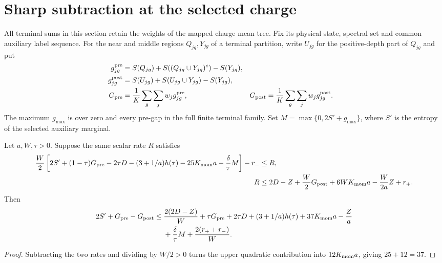 \section{Sharp subtraction at the selected charge}
\label{sec:arealaw-selected-sharp-comparison}

All terminal sums in this section retain the weights of the mapped
charge mean tree. Fix its physical state, spectral set and common
auxiliary label sequence. For the near and middle regions $Q_{jg},Y_{jg}$
of a terminal partition, write $U_{jg}$ for the positive-depth part of
$Q_{jg}$ and put
\begin{align}
    g^{\rm pre}_{jg}
                 & =S(Q_{jg})+S((Q_{jg}\cup Y_{jg})^c)-S(Y_{jg}),\nonumber   \\
    g^{\rm post}_{jg}
                 & =S(U_{jg})+S(U_{jg}\cup Y_{jg})-S(Y_{jg}),\nonumber       \\
    G_{\rm pre}  & =\frac1K\sum_g\sum_jw_jg^{\rm pre}_{jg},                &
    G_{\rm post} & =\frac1K\sum_g\sum_jw_jg^{\rm post}_{jg}.
    \label{eq:arealaw-selected-terminal-averages}
\end{align}
The maximum $g_{\max}$ is over zero and every pre-gap in the full finite
terminal family. Set $M=\max\{0,2S'+g_{\max}\}$, where $S'$ is the
entropy of the selected auxiliary marginal.

\begin{lemma}
    \label{thm:arealaw-sharp-comparison-subtraction}
    \leanok
    Let $a,W,\tau>0$. Suppose the same scalar rate $R$ satisfies
    \begin{align}
        \frac W2\left[2S'+(1-\tau)G_{\rm pre}-2\tau D
            -(3+1/a)h(\tau)-25K_{\rm mom}a-\frac\delta\tau M\right]-r_-
          & \le R,\nonumber              \\
        R & \le2D-Z+\frac W2G_{\rm post}
        +6WK_{\rm mom}a-\frac W{2a}Z+r_+.
        \label{eq:arealaw-sharp-scalar-premises}
    \end{align}
    Then
    \begin{align}
        2S'+G_{\rm pre}-G_{\rm post}
        \le{} & \frac{2(2D-Z)}W+\tau G_{\rm pre}+2\tau D
        +(3+1/a)h(\tau)+37K_{\rm mom}a-\frac Za\nonumber \\
              & +\frac\delta\tau M+\frac{2(r_++r_-)}W.
        \label{eq:arealaw-sharp-scalar-subtraction}
    \end{align}
\end{lemma}
\begin{proof}
    \leanok
    Subtracting the two rates and dividing by $W/2>0$ turns the upper quadratic
    contribution into $12K_{\rm mom}a$, giving $25+12=37$.
\end{proof}

